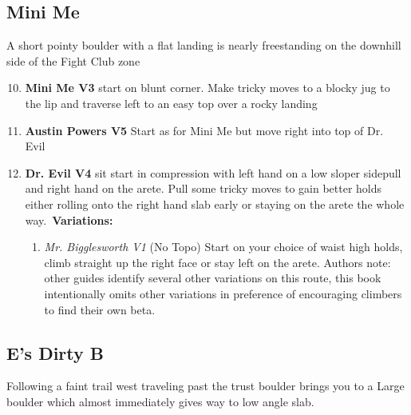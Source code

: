\begin{multicols*}{2}
			\subsection*{Mini Me}\label{bf:Mini Me}
			A short pointy boulder with a flat landing is nearly freestanding on the downhill side of the Fight Club zone
			
				\begin{enumerate}[]
					\setcounter{enumi}{9}
					\item\label{rt:Mini Me} \colorbox{green!20}{\textbf{Mini Me V3  } }
					\newline start on blunt corner. Make tricky moves to a blocky jug to the lip and traverse left to an easy top over a rocky landing\
					\setcounter{enumi}{10}
					\item\label{rt:Austin Powers} \colorbox{RoyalBlue!20}{\textbf{Austin Powers V5    } }
					\newline Start as for Mini Me but move right into top of Dr. Evil\
					\setcounter{enumi}{11}
					\item\label{rt:Dr. Evil} \colorbox{RoyalBlue!20}{\textbf{Dr. Evil V4    } }
					\newline sit start in compression with left hand on a low sloper sidepull and right hand on the arete. Pull some tricky moves to gain better holds either rolling onto the right hand slab early or staying on the arete the whole way.\
					\newline \textbf{Variations:}
					\begin{enumerate}
						\item\label{vr:Mr. Bigglesworth} \colorbox{green!20}{\emph{Mr. Bigglesworth V1 \ding{72} \ding{72}  }  }
							\newline (No Topo) 
						\newline Start on your choice of waist high holds, climb straight up the right face or stay left on the arete. Authors note: other guides identify several other variations on this route, this book intentionally omits other variations in preference of encouraging climbers to find their own beta.\
					\end{enumerate}
				\end{enumerate}

			\subsection*{E's Dirty B}\label{bf:E's Dirty B}
			Following a faint trail west traveling past the trust boulder brings you to a Large boulder which almost immediately gives way to low angle slab.
			

\end{multicols*}
